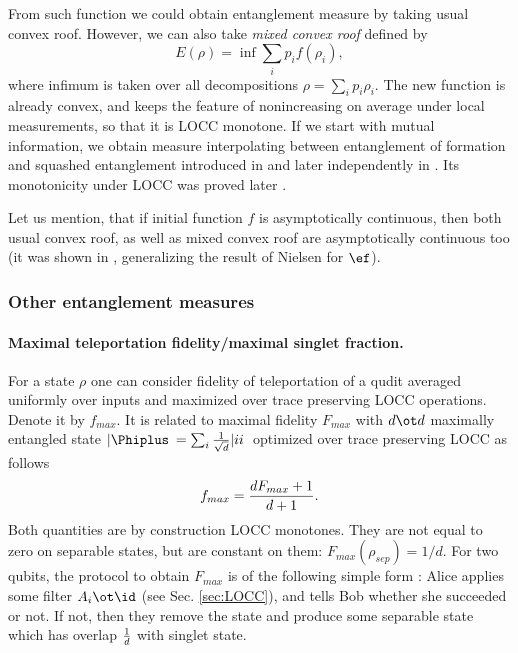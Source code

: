 \documentclass[rmp,12pt,preprint]{revtex4-2}
\begin{document}
From such function we could obtain entanglement measure
by taking usual convex roof. However, we can also take {\it mixed
convex roof} defined by \begin{equation} E(\rho)=\inf \sum_ip_i f(\rho_i), \end{equation}
where infimum is taken over all decompositions $\rho=\sum_ip_i
\rho_i$. The new function is already convex, and keeps the feature of
nonincreasing on average under local measurements, so that it is
LOCC monotone. If we start with mutual information, we obtain
measure  interpolating between entanglement of formation and squashed entanglement
introduced in \cite{Tucci2002-squashed}
and later independently in \cite {NagelR2003-ent-mutual}. Its monotonicity under
LOCC was proved later \cite{multisquash}.


Let us mention, that if initial function $f$ is asymptotically
continuous, then both usual convex roof, as well as mixed convex
roof are asymptotically continuous  too (it was shown in
\cite{Synak05-asym}, generalizing the result of Nielsen
\cite{Nielsen-cont} for $\ef$).

\subsubsection{Other entanglement measures}
\label{subsubsec:other-measures}

\paragraph{Maximal teleportation fidelity/maximal singlet fraction.}
For a state $\rho$ one can consider fidelity of teleportation of a
qudit averaged uniformly over inputs and maximized over trace preserving LOCC operations.
Denote it by $f_{max}$. It is related to maximal fidelity $F_{max}$ with $d\ot d$
maximally entangled state $|\Phiplus\>=\sum_i{1\over \sqrt{d}}|ii\>$ optimized over trace preserving LOCC \cite{Rains1999} as follows
\cite{gentele}
\begin{equation}
f_{max}={dF_{max} +1 \over d+1}.
\end{equation}
Both quantities are
by construction LOCC monotones. They are not equal to zero on
separable states, but are constant on them: $F_{max}(\rho_{sep})=1/d$.
For two qubits, the protocol to obtain $F_{max}$ is of the following
simple form \cite{VerstraeteV2003-maxtel}: Alice applies some filter
$A_i\ot \id$ (see Sec. \ref{sec:LOCC}), and tells Bob whether  she
succeeded or not. If not, then they remove the state and produce
some separable state which has overlap $1\over d$ with singlet
state.
\end{document}
